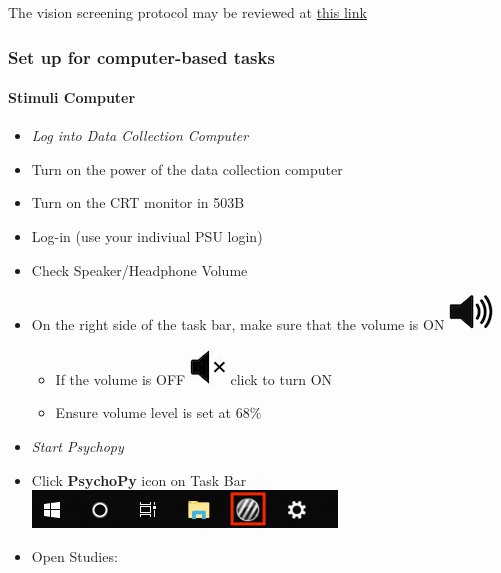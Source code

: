 \documentclass[]{article}
\providecommand{\tightlist}{%
  \setlength{\itemsep}{0pt}\setlength{\parskip}{0pt}}
\let\oldparagraph\paragraph
\renewcommand{\paragraph}[1]{\oldparagraph{#1}\mbox{}}
\begin{document}
The vision screening protocol may be reviewed at
\href{vision-screening-protocol.html}{this link}

\subsubsection{Set up for computer-based
tasks}\label{set-up-for-computer-based-tasks}

\paragraph{Stimuli Computer}\label{stimuli-computer}

\begin{itemize}
\item
  \emph{Log into Data Collection Computer}
\item
  Turn on the power of the data collection computer
\item
  Turn on the CRT monitor in 503B
\item
  Log-in (use your indiviual PSU login)
\item
  Check Speaker/Headphone Volume
\item
  On the right side of the task bar, make sure that the volume is ON
  \includegraphics{images/volume_on.png}

  \begin{itemize}
  \tightlist
  \item
    If the volume is OFF \includegraphics{images/audio_off.jpeg} click
    to turn ON
  \item
    Ensure volume level is set at 68\%
  \end{itemize}
\item
  \emph{Start Psychopy}
\item
  Click \textbf{PsychoPy} icon on Task Bar
  \includegraphics{images/PsychoPy-1.PNG}\\
\item
  Open Studies:


\end{itemize}
\end{document}
